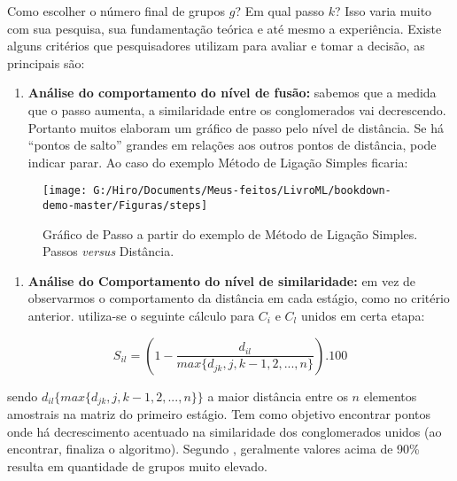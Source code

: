 \documentclass[
  openany]{book}
\providecommand{\tightlist}{%
  \setlength{\itemsep}{0pt}\setlength{\parskip}{0pt}}
\begin{document}
Como escolher o número final de grupos \(g\)? Em qual passo \(k\)? Isso varia muito com sua pesquisa, sua fundamentação teórica e até mesmo a experiência. Existe alguns critérios que pesquisadores utilizam para avaliar e tomar a decisão, as principais são:

\begin{enumerate}
\def\labelenumi{\arabic{enumi}.}
\tightlist
\item
  \textbf{Análise do comportamento do nível de fusão:} sabemos que a medida que o passo aumenta, a similaridade entre os conglomerados vai decrescendo. Portanto muitos elaboram um gráfico de passo pelo nível de distância. Se há ``pontos de salto'' grandes em relações aos outros pontos de distância, pode indicar parar. Ao caso do exemplo Método de Ligação Simples ficaria:
\end{enumerate}

\begin{figure}

{\centering \texttt{[image: G:/Hiro/Documents/Meus-feitos/LivroML/bookdown-demo-master/Figuras/steps]} 

}

\caption{Gráfico de Passo a partir do exemplo de Método de Ligação Simples. Passos \emph{versus} Distância.}\label{fig:steps}
\end{figure}



\begin{enumerate}
\def\labelenumi{\arabic{enumi}.}
\setcounter{enumi}{1}
\tightlist
\item
  \textbf{Análise do Comportamento do nível de similaridade:} em vez de observarmos o comportamento da distância em cada estágio, como no critério anterior. utiliza-se o seguinte cálculo para \(C_i\) e \(C_l\) unidos em certa etapa:
\end{enumerate}

\begin{equation}
S_{il}=(1-\frac{d_{il}}{max\{d_{jk},j,k-1,2,...,n\}}).100
 \label{eq:critsimi}
\end{equation}

sendo \(d_{il}\{max\{d_{jk},j,k-1,2,...,n\}\}\) a maior distância entre os \(n\) elementos amostrais na matriz do primeiro estágio. Tem como objetivo encontrar pontos onde há decrescimento acentuado na similaridade dos conglomerados unidos (ao encontrar, finaliza o algoritmo). Segundo \citet{felix2004}, geralmente valores acima de 90\% resulta em quantidade de grupos muito elevado.
\end{document}
